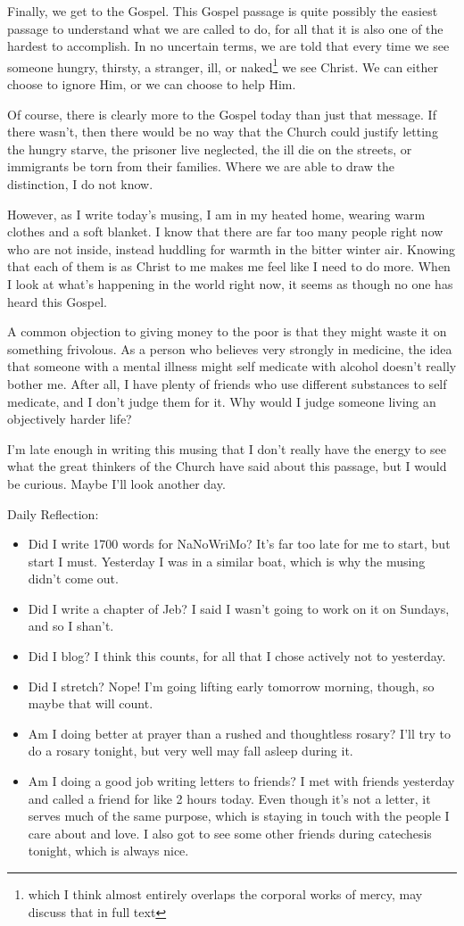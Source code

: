 \documentclass[12pt]{article}[titlepage]
\newcommand{\1}{\={a}}
\newcommand{\2}{\={e}}
\newcommand{\3}{\={\i}}
\newcommand{\4}{\=o}
\newcommand{\5}{\=u}
\newcommand{\6}{\={A}}
\renewcommand{\,}{\textsuperscript{,}}
\begin{document}
Finally, we get to the Gospel.
This Gospel passage is quite possibly the easiest passage to understand what we are called to do, for all that it is also one of the hardest to accomplish.
In no uncertain terms, we are told that every time we see someone hungry, thirsty, a stranger, ill, or naked\footnote{which I think almost entirely overlaps the corporal works of mercy, may discuss that in full text} we see Christ.
We can either choose to ignore Him, or we can choose to help Him.

Of course, there is clearly more to the Gospel today than just that message.
If there wasn't, then there would be no way that the Church could justify letting the hungry starve, the prisoner live neglected, the ill die on the streets, or immigrants be torn from their families.
Where we are able to draw the distinction, I do not know.

However, as I write today's musing, I am in my heated home, wearing warm clothes and a soft blanket.
I know that there are far too many people right now who are not inside, instead huddling for warmth in the bitter winter air.
Knowing that each of them is as Christ to me makes me feel like I need to do more.
When I look at what's happening in the world right now, it seems as though no one has heard this Gospel.

A common objection to giving money to the poor is that they might waste it on something frivolous.
As a person who believes very strongly in medicine, the idea that someone with a mental illness might self medicate with alcohol doesn't really bother me.
After all, I have plenty of friends who use different substances to self medicate, and I don't judge them for it.
Why would I judge someone living an objectively harder life?

I'm late enough in writing this musing that I don't really have the energy to see what the great thinkers of the Church have said about this passage, but I would be curious.
Maybe I'll look another day.

Daily Reflection:
\begin{itemize}
\item Did I write 1700 words for NaNoWriMo? It's far too late for me to start, but start I must. Yesterday I was in a similar boat, which is why the musing didn't come out.
\item Did I write a chapter of Jeb? I said I wasn't going to work on it on Sundays, and so I shan't.
\item Did I blog? I think this counts, for all that I chose actively not to yesterday.
\item Did I stretch? Nope! I'm going lifting early tomorrow morning, though, so maybe that will count.
\item Am I doing better at prayer than a rushed and thoughtless rosary? I'll try to do a rosary tonight, but very well may fall asleep during it.
\item Am I doing a good job writing letters to friends? I met with friends yesterday and called a friend for like 2 hours today. Even though it's not a letter, it serves much of the same purpose, which is staying in touch with the people I care about and love.
I also got to see some other friends during catechesis tonight, which is always nice.
\end{itemize}
\end{document}
